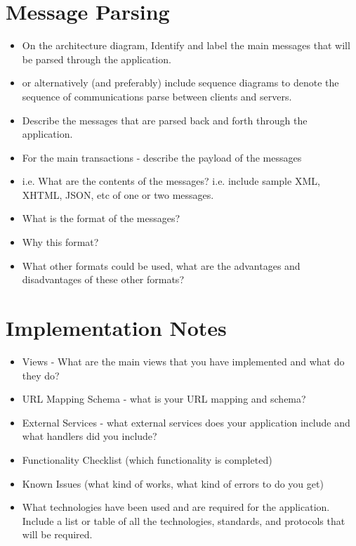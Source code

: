 \documentclass{sig-alt-release2}
\begin{document}
\section{Message Parsing}
\begin{itemize}

\item	On the architecture diagram, Identify and label the main messages that will be parsed through the application.
\item	or alternatively (and preferably) include sequence diagrams to denote the sequence of communications parse between clients and servers.
\item	Describe the messages that are parsed back and forth through the application.
\item	For the main transactions - describe the payload of the messages 
\item	i.e. What are the contents of the messages? i.e. include sample XML, XHTML, JSON, etc of one or two messages.
\item	What is the format of the messages? 
\item	Why this format? 
\item	What other formats could be used, what are the advantages and disadvantages of these other formats?
\end{itemize}




\section{Implementation Notes}

\begin{itemize}
\item Views - What are the main views that you have implemented and what do they do?
\item URL Mapping Schema - what is your URL mapping and schema?
\item External Services  - what external services does your application include and what handlers did you include?
\item	Functionality Checklist (which functionality is completed)
\item	Known Issues (what kind of works, what kind of errors to do you get)
\item What technologies have been used and are required for the application. Include a list or table of all the technologies, standards, and protocols that will be required.
\end{itemize}
\end{document}
